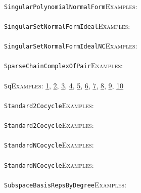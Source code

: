 \documentclass[a4paper,11pt]{report}
\begin{document}
{{ \\
 \texttt{SingularPolynomialNormalForm}{\nobreakspace}{\nobreakspace}{\nobreakspace}{\nobreakspace}\textsc{Examples:} \\
 \\
 \texttt{SingularSetNormalFormIdeal}{\nobreakspace}{\nobreakspace}{\nobreakspace}{\nobreakspace}\textsc{Examples:} \\
 \\
 \texttt{SingularSetNormalFormIdealNC}{\nobreakspace}{\nobreakspace}{\nobreakspace}{\nobreakspace}\textsc{Examples:} \\
 \\
 \texttt{SparseChainComplexOfPair}{\nobreakspace}{\nobreakspace}{\nobreakspace}{\nobreakspace}\textsc{Examples:} \\
 \\
 \texttt{Sq}{\nobreakspace}{\nobreakspace}{\nobreakspace}{\nobreakspace}\textsc{Examples:} \href{tutorial/chap7.html} {1}{\nobreakspace}, \href{tutorial/chap10.html} {2}{\nobreakspace}, \href{../www/SideLinks/About/aboutArtinGroups.html} {3}{\nobreakspace}, \href{../www/SideLinks/About/aboutModPRings.html} {4}{\nobreakspace}, \href{../www/SideLinks/About/aboutAspherical.html} {5}{\nobreakspace}, \href{../www/SideLinks/About/aboutNonabelian.html} {6}{\nobreakspace}, \href{../www/SideLinks/About/aboutQuandles2.html} {7}{\nobreakspace}, \href{../www/SideLinks/About/aboutKnots.html} {8}{\nobreakspace}, \href{../www/SideLinks/About/aboutTensorSquare.html} {9}{\nobreakspace}, \href{../www/SideLinks/About/aboutKnotsQuandles.html} {10}{\nobreakspace} \\
 \\
 \texttt{Standard2Cocycle}{\nobreakspace}{\nobreakspace}{\nobreakspace}{\nobreakspace}\textsc{Examples:} \\
 \\
 \texttt{Standard2Cocycle}{\nobreakspace}{\nobreakspace}{\nobreakspace}{\nobreakspace}\textsc{Examples:} \\
 \\
 \texttt{StandardNCocycle}{\nobreakspace}{\nobreakspace}{\nobreakspace}{\nobreakspace}\textsc{Examples:} \\
 \\
 \texttt{StandardNCocycle}{\nobreakspace}{\nobreakspace}{\nobreakspace}{\nobreakspace}\textsc{Examples:} \\
 \\
 \texttt{SubspaceBasisRepsByDegree}{\nobreakspace}{\nobreakspace}{\nobreakspace}{\nobreakspace}\textsc{Examples:} \\
}}
\end{document}
